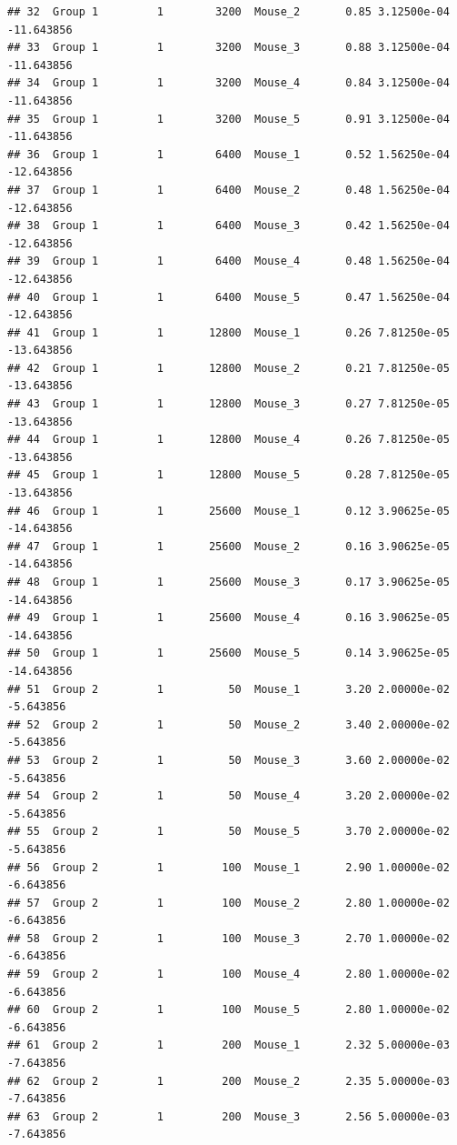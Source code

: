 \documentclass[
]{book}
\begin{document}
\begin{verbatim}
## 32  Group 1         1        3200  Mouse_2       0.85 3.12500e-04   -11.643856
## 33  Group 1         1        3200  Mouse_3       0.88 3.12500e-04   -11.643856
## 34  Group 1         1        3200  Mouse_4       0.84 3.12500e-04   -11.643856
## 35  Group 1         1        3200  Mouse_5       0.91 3.12500e-04   -11.643856
## 36  Group 1         1        6400  Mouse_1       0.52 1.56250e-04   -12.643856
## 37  Group 1         1        6400  Mouse_2       0.48 1.56250e-04   -12.643856
## 38  Group 1         1        6400  Mouse_3       0.42 1.56250e-04   -12.643856
## 39  Group 1         1        6400  Mouse_4       0.48 1.56250e-04   -12.643856
## 40  Group 1         1        6400  Mouse_5       0.47 1.56250e-04   -12.643856
## 41  Group 1         1       12800  Mouse_1       0.26 7.81250e-05   -13.643856
## 42  Group 1         1       12800  Mouse_2       0.21 7.81250e-05   -13.643856
## 43  Group 1         1       12800  Mouse_3       0.27 7.81250e-05   -13.643856
## 44  Group 1         1       12800  Mouse_4       0.26 7.81250e-05   -13.643856
## 45  Group 1         1       12800  Mouse_5       0.28 7.81250e-05   -13.643856
## 46  Group 1         1       25600  Mouse_1       0.12 3.90625e-05   -14.643856
## 47  Group 1         1       25600  Mouse_2       0.16 3.90625e-05   -14.643856
## 48  Group 1         1       25600  Mouse_3       0.17 3.90625e-05   -14.643856
## 49  Group 1         1       25600  Mouse_4       0.16 3.90625e-05   -14.643856
## 50  Group 1         1       25600  Mouse_5       0.14 3.90625e-05   -14.643856
## 51  Group 2         1          50  Mouse_1       3.20 2.00000e-02    -5.643856
## 52  Group 2         1          50  Mouse_2       3.40 2.00000e-02    -5.643856
## 53  Group 2         1          50  Mouse_3       3.60 2.00000e-02    -5.643856
## 54  Group 2         1          50  Mouse_4       3.20 2.00000e-02    -5.643856
## 55  Group 2         1          50  Mouse_5       3.70 2.00000e-02    -5.643856
## 56  Group 2         1         100  Mouse_1       2.90 1.00000e-02    -6.643856
## 57  Group 2         1         100  Mouse_2       2.80 1.00000e-02    -6.643856
## 58  Group 2         1         100  Mouse_3       2.70 1.00000e-02    -6.643856
## 59  Group 2         1         100  Mouse_4       2.80 1.00000e-02    -6.643856
## 60  Group 2         1         100  Mouse_5       2.80 1.00000e-02    -6.643856
## 61  Group 2         1         200  Mouse_1       2.32 5.00000e-03    -7.643856
## 62  Group 2         1         200  Mouse_2       2.35 5.00000e-03    -7.643856
## 63  Group 2         1         200  Mouse_3       2.56 5.00000e-03    -7.643856

\end{verbatim}
\end{document}
